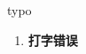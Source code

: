 
\begin{frame}
{\huge typo}
\begin{center}
\begin{enumerate}\Large
  \item \textbf{打字错误}
\end{enumerate}
\end{center}
\end{frame}
